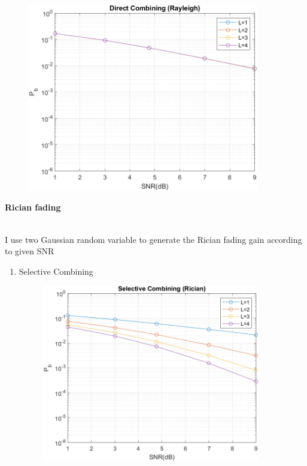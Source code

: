 \documentclass{article}
\begin{document}
\begin{flushleft}
\begin{enumerate}
\begin{enumerate}
			\begin{figure}[H]
			\centering
			\includegraphics[width=0.9\textwidth, height=0.4\textheight]{Rayleigh_DC}
			\end{figure}
	\end{enumerate}
\newpage
	{\Large \item  \bf Rician fading}\\
	I use two Gaussian random variable to generate the Rician fading gain according to given SNR
	\begin{enumerate}
		\item  Selective Combining\\
			\begin{figure}[H]
			\centering
			\includegraphics[width=0.9\textwidth, height=0.4\textheight]{Rician_SC}

\end{figure}
\end{enumerate}
\end{enumerate}
\end{flushleft}
\end{document}
